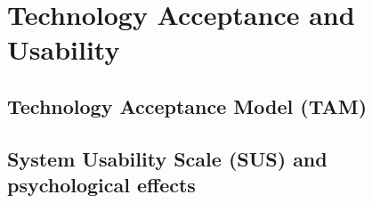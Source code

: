 \section{Technology Acceptance and Usability}

\subsection{Technology Acceptance Model (TAM)}

\subsection{System Usability Scale (SUS) and psychological effects}
